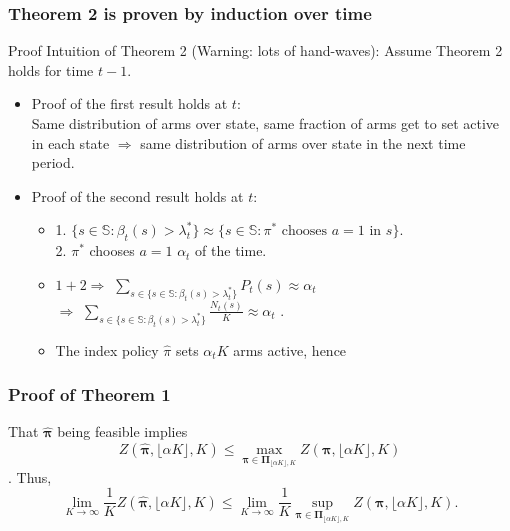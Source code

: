 \documentclass{beamer}
\newcommand{\allp}{\pmb{\pi}}
\newcommand{\allpset}{\mathbf{\Pi}}
\newcommand{\substates}{\mathbb{S}}
\begin{document}
\begin{frame}
\frametitle{Theorem 2 is proven by induction over time}
Proof Intuition of Theorem 2 (Warning: lots of hand-waves):
Assume Theorem 2 holds for time $t-1$.
\begin{itemize}
\item Proof of the first result holds at $t$:\\
Same distribution of arms over state, same fraction of arms get to set active in each state $\Rightarrow$ same distribution of arms over state in the next time period.
\item Proof of the second result holds at $t$:\\
\begin{itemize}
\item 1. $\{s\in \substates: \beta_t(s)>\lambda^*_t\}\approx \{s\in \substates: \pi^{*} \text{ chooses } a=1 \text{ in } s\}$.\\
\hspace{0.05cm}2. $\pi^{*}$ chooses $a=1$ $\alpha_t$ of the time.
\item $1 + 2\Rightarrow$ $\sum_{s\in \{s\in \substates: \beta_t(s)>\lambda^*_t\}}P_t(s)\approx\alpha_t$ \\
$\Rightarrow$  $\sum_{s\in \{s\in \substates: \beta_t(s)>\lambda^*_t\}}\frac{N_t(s)}{K}\approx\alpha_t$ .
\item The index policy $\hat{\pi}$ sets $\alpha_t K$ arms active, hence 
\end{itemize}
\end{itemize}
\end{frame}

\begin{frame}
\frametitle{Proof of Theorem 1}
That $\hat{\allp}$ being feasible implies $$Z(\hat{\allp},\lfloor \alpha K\rfloor,K) \leq \max_{\allp\in\allpset_{\lfloor \alpha K\rfloor,K}}Z(\allp,\lfloor \alpha K\rfloor,K)$$.  Thus,
\begin{equation*}
\lim_{K\rightarrow\infty}\frac{1}{K}Z(\hat{\allp},\lfloor \alpha K\rfloor,K) \leq  \lim_{K\rightarrow\infty}\frac{1}{K}\sup_{\allp\in\allpset_{\lfloor \alpha K\rfloor,K}}Z(\allp,\lfloor \alpha K\rfloor,K).
\end{equation*}
\end{frame}
\end{document}
